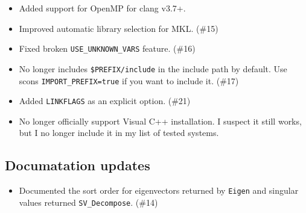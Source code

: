 \begin{itemize}
\item Added support for OpenMP for clang v3.7+.
\item Improved automatic library selection for MKL. (\#15)
\item Fixed broken \texttt{USE\_UNKNOWN\_VARS} feature. (\#16)
\item No longer includes \texttt{\$PREFIX/include} in the include path by default.
  Use scons \texttt{IMPORT\_PREFIX=true} if you want to include it. (\#17)
\item Added \texttt{LINKFLAGS} as an explicit option. (\#21)
\item No longer officially support Visual C++ installation.  I suspect it still
  works, but I no longer include it in my list of tested systems.
\end{itemize}

\subsection{Documatation updates}

\begin{itemize}
\item Documented the sort order for eigenvectors returned by \texttt{Eigen} and singular
  values returned \texttt{SV\_Decompose}. (\#14)
\end{itemize}
